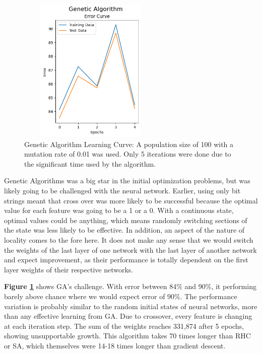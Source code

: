 \documentclass[letterpaper]{article} %
\begin{document}
\begin{figure}[!htb]
\centering
\includegraphics[width=2.75in, height=2.75in]{figures/Genetic_Algorithm__algorithm_ga_epochs_5_max_iters_3_max_attempts_3_seed_1_.png}
\caption{Genetic Algorithm Learning Curve:  A population size of 100 with a mutation rate of 0.01 was used.  Only 5 iterations were done due to the significant time used by the algorithm.  }
\label{fig:nn_ga}
\end{figure}

Genetic Algorithms was a big star in the initial optimization problems, but was likely going to be challenged with the neural network.  Earlier, using only bit strings meant that cross over was more likely to be successful because the optimal value for each feature was going to be a 1 or a 0.  With a continuous state, optimal values could be anything, which means randomly switching sections of the state was less likely to be effective.  In addition, an aspect of the nature of locality comes to the fore here.  It does not make any sense that we would switch the weights of the last layer of one network with the last layer of another network and expect improvement, as their performance is totally dependent on the first layer weights of their respective networks. 

 \textbf{Figure \ref{fig:nn_ga}} shows GA's challenge.   With error between 84\% and 90\%, it performing barely above chance where we would expect error of 90\%.  The performance variation is probably similar to the random initial states of neural networks, more than any effective learning from GA. Due to crossover, every feature is changing at each iteration step.   The sum of the weights reaches 331,874 after 5 epochs, showing unsupportable growth.  This algorithm takes 70 times longer than RHC or SA, which themselves were 14-18 times longer than gradient descent.
 
\end{document}
